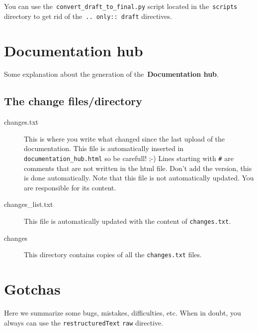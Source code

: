 \documentclass[a4paper,10pt]{article}
\newcommand{\code}[1]{\texttt{#1}}
\newcommand{\dhub}{{\bf Documentation hub}}
\begin{document}
You can use the~\code{convert\_draft\_to\_final.py} script located in the~\code{scripts} directory to get rid of the~\code{..	only:: draft} directives.

\section{\dhub}

Some explanation about the generation of the~\dhub.
\subsection{The change files/directory}

\begin{description}
 \item[changes.txt] This is where you write what changed since the last upload of the documentation. This file is automatically inserted in \verb+documentation_hub.html+ so be carefull! ;-) Lines starting with \verb+#+ are comments that are not written in the html file. Don't add the version, this is done automatically. Note that this file is not automatically updated. You are responsible for its content.
 \item[changes\_list.txt] This file is automatically updated with the content of \verb+changes.txt+.
 \item[changes] This directory contains copies of all the \verb+changes.txt+ files.
 \end{description}




\section{Gotchas}

Here we summarize some bugs, mistakes, difficulties, etc. When in doubt, you always can use the \code{restructuredText}
\code{raw} directive.
\end{document}
